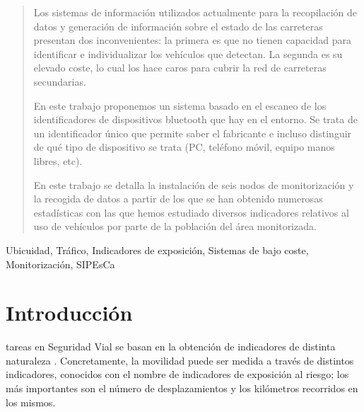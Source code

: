 \documentclass[twocolumn,twoside]{Jornadas}
\begin{document}
\begin{abstract}


Los sistemas de información utilizados actualmente para la recopilación de datos y generación de información sobre el estado de las carreteras presentan dos inconvenientes: la primera es que no tienen capacidad para identificar e individualizar los vehículos que detectan. 
La segunda es su elevado coste, lo cual los hace caros para cubrir la red de carreteras secundarias. %

En este trabajo proponemos un sistema basado en el escaneo de los identificadores de dispositivos bluetooth que hay en el entorno. Se trata de un identificador 
único que permite saber el fabricante e incluso distinguir de qué tipo de dispositivo se trata (PC, teléfono móvil, equipo manos libres, etc).


En este trabajo se detalla la instalación de seis nodos de monitorización y la recogida de datos a partir de los que se han obtenido numerosas estadísticas con las que hemos estudiado diversos indicadores relativos al uso de vehículos por parte de la población del área monitorizada.

\end{abstract}

\begin{keywords}
Ubicuidad, Tráfico, Indicadores de exposición, Sistemas de bajo coste, Monitorización, SIPEsCa
\end{keywords}


\section{Introducción}
 tareas en Seguridad Vial se basan en la obtención de indicadores de distinta naturaleza \cite{urlDGT}. Concretamente, la movilidad puede ser medida a través de distintos indicadores, conocidos con el nombre de indicadores de exposición al riesgo; los más importantes son el número de desplazamientos y los kilómetros recorridos en los mismos. 
\end{document}
